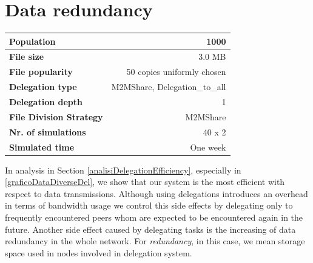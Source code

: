 \newpage
\section{Data redundancy}
\begin{table}[h]
\begin{center}
\begin{tabular}{|l|r|}
\hline
\bfseries Population & 1000 \\
\hline
\bfseries File size & 3.0 MB \\
\hline
\bfseries File popularity & 50 copies uniformly chosen \\
\hline
\bfseries Delegation type & M2MShare, Delegation\_to\_all \\
\hline
\bfseries Delegation depth & 1 \\
\hline
\bfseries File Division Strategy & M2MShare \\
\hline
\bfseries Nr. of simulations & 40 x 2\\
\hline
\bfseries Simulated time & One week \\
\hline
\end{tabular}
\end{center}
\end{table}

In analysis in Section \ref{analisiDelegationEfficiency}, especially in \figurename~ \ref{graficoDataDiverseDel}, we show that our system is the most efficient with respect to data transmissions. Although using delegations introduces an overhead in terms of bandwidth usage we control this side effects by delegating only to frequently encountered peers whom are expected to be encountered again in the future. Another side effect caused by delegating tasks is the increasing of data redundancy in the whole network. For \textit{redundancy}, in this case, we mean storage space used in nodes involved in delegation system. 
\\ 

